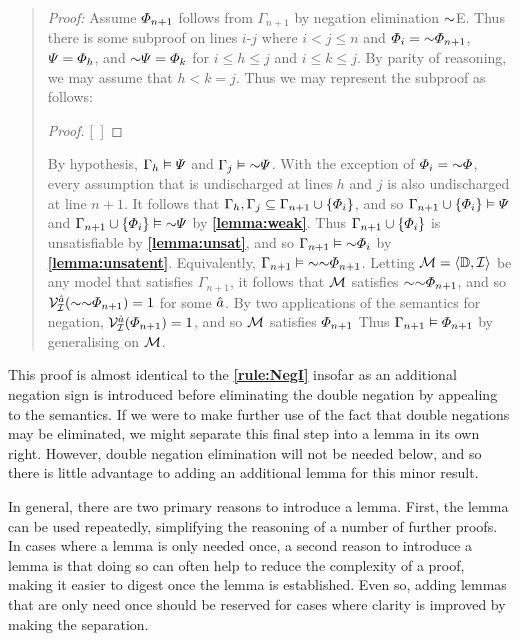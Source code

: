 \begin{quote} 
  \textit{Proof:} Assume $\varPhi_{n+1}$ follows from $\Gamma_{n+1}$ by negation elimination $\enot$E.
  Thus there is some subproof on lines $i$-$j$ where $i<j\leq n$ and $\metaA_i=\enot\metaA_{n+1}$, $\varPsi=\varPhi_h$, and $\enot\metaB=\metaA_k$ for $i\leq h\leq j$ and $i\leq k\leq j$.
  By parity of reasoning, we may assume that $h<k=j$.
  Thus we may represent the subproof as follows:

  \begin{proof}
  \open
     
  \close
  [\ ]{\metaA} %
  \end{proof}

  By hypothesis, $\Gamma_h \vDash \varPsi$ and $\Gamma_j \models \enot\metaB$.
  With the exception of $\metaA_i=\enot\metaA$, every assumption that is undischarged at lines $h$ and $j$ is also undischarged at line $n+1$.
  It follows that $\Gamma_h,\Gamma_j\subseteq\Gamma_{n+1}\cup\lbrace\varPhi_i\rbrace$, and so $\Gamma_{n+1}\cup\lbrace\varPhi_i\rbrace \vDash \varPsi$ and $\Gamma_{n+1}\cup\set{\metaA_i} \models \enot\metaB$ by \textbf{\ref{lemma:weak}}.
  Thus $\Gamma_{n+1}\cup\lbrace\varPhi_i\rbrace$ is unsatisfiable by \textbf{\ref{lemma:unsat}}, and so $\Gamma_{n+1} \models \enot\metaA_i$ by \textbf{\ref{lemma:unsatent}}.
  Equivalently, $\Gamma_{n+1} \models \enot\enot\metaA_{n+1}$.
  Letting $\mathcal{M}=\langle\mathbb{D},\mathcal{I}\rangle$ be any model that satisfies $\Gamma_{n+1}$, it follows that $\mathcal{M}$ satisfies $\enot\enot\metaA_{n+1}$, and so $\VV{\I}{\va{a}}(\enot\enot\metaA_{n+1})=1$ for some $\hat{a}$. 
  By two applications of the semantics for negation, $\mathcal{V}_{\mathcal{I}}^{\hat{a}}(\varPhi_{n+1})=1$, and so $\mathcal{M}$ satisfies $\varPhi_{n+1}$
  Thus $\Gamma_{n+1} \vDash \varPhi_{n+1}$ by generalising on $\mathcal{M}$.
\end{quote}

This proof is almost identical to the \textbf{\ref{rule:NegI}} insofar as an additional negation sign is introduced before eliminating the double negation by appealing to the semantics.
If we were to make further use of the fact that double negations may be eliminated, we might separate this final step into a lemma in its own right.
However, double negation elimination will not be needed below, and so there is little advantage to adding an additional lemma for this minor result.

In general, there are two primary reasons to introduce a lemma.
First, the lemma can be used repeatedly, simplifying the reasoning of a number of further proofs.
In cases where a lemma is only needed once, a second reason to introduce a lemma is that doing so can often help to reduce the complexity of a proof, making it easier to digest once the lemma is established.
Even so, adding lemmas that are only need once should be reserved for cases where clarity is improved by making the separation. 






